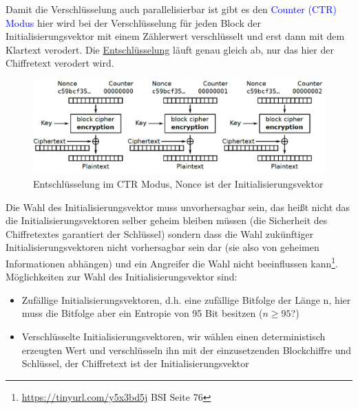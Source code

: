 \documentclass[a4paper,12pt,leqno]{article}
\newcommand{\blue}[1]{\textcolor{blue}{#1}}
\begin{document}
Damit die Verschlüsselung auch parallelisierbar ist gibt es den \blue{Counter (CTR) Modus} hier wird bei der Verschlüsselung für jeden Block der Initialisierungsvektor mit einem Zählerwert verschlüsselt und erst dann mit dem Klartext verodert. Die \hyperref[pic:CTRModus]{Entschlüsselung} läuft genau gleich ab, nur das hier der Chiffretext verodert wird.\\
\begin{figure}
\centering
\includegraphics[scale=0.5]{Grafiken/CounterCTRModus.png}
\caption{Entschlüsselung im CTR Modus, Nonce ist der Initialisierungsvektor}
\label{pic:CTRModus}
\end{figure}
Die Wahl des Initialisierungsvektor muss unvorhersagbar sein, das heißt nicht das die Initialisierungsvektoren selber geheim bleiben müssen (die Sicherheit des Chiffretextes garantiert der Schlüssel) sondern dass die Wahl zukünftiger Initialisierungsvektoren nicht vorhersagbar sein dar (sie also von geheimen Informationen abhängen) und ein Angreifer die Wahl nicht beeinflussen kann\footnote{\url{https://tinyurl.com/y5x3bd5j} BSI Seite 76}.\\
Möglichkeiten zur Wahl des Initialisierungsvektor sind:
\begin{itemize}
\item Zufällige Initialisierungsvektoren, d.h. eine zufällige Bitfolge der Länge n, hier muss die Bitfolge aber ein Entropie von 95 Bit besitzen ($n\geq95$?)
\item Verschlüsselte Initialisierungsvektoren, wir wählen einen deterministisch erzeugten Wert und verschlüsseln ihn mit der einzusetzenden Blockchiffre und Schlüssel, der Chiffretext ist der Initialisierungsvektor
\end{itemize}
\end{document}
